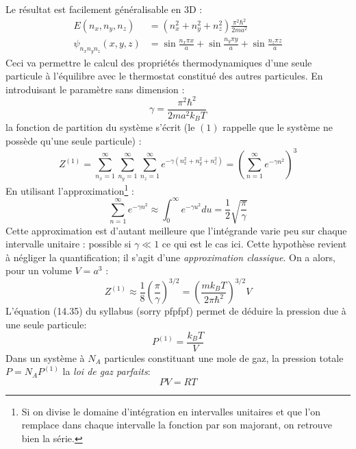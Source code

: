 \documentclass	[11pt, a4paper, openany]{book}
\begin{document}
Le résultat est facilement généralisable en 3D :
\begin{equation}
\begin{array}{ll}
E(n_x,n_y,n_z) &= (n_x^2 +n_y^2+n_z^2)\frac{\pi^2\hbar^2}{2ma^2}\\
\psi_{n_xn_yn_z}(x,y,z) &= \sin\frac{n_x\pi x}{a}+\sin\frac{n_y\pi y}{a}+\sin\frac{n_z\pi z}{a}
\end{array} 
\end{equation}
Ceci va permettre le calcul des propriétés thermodynamiques d'une seule particule à l'équilibre avec
le thermostat constitué des autres particules. En introduisant le paramètre sans dimension :
\begin{equation}
\gamma = \dfrac{\pi^2\hbar^2}{2ma^2k_BT}
\end{equation} 
la fonction de partition du système s'écrit (le $(1)$ rappelle que le système ne possède qu'une
seule particule) :
\begin{equation}
Z^{(1)} = \sum_{n_x=1}^\infty\sum_{n_y=1}^\infty\sum_{n_z=1}^\infty e^{-\gamma(n_x^2 +n_y^2+n_z^2)}
 = \left(\sum_{n=1}^\infty e^{-\gamma n^2}\right)^3
\end{equation}
En utilisant l'approximation\footnote{Si on divise le domaine d'intégration en intervalles unitaires et
que l'on remplace dans chaque intervalle la fonction par son majorant, on retrouve bien la série.} :
\begin{equation}
\sum_{n=1}^\infty e^{-\gamma n^2} \approx \int_0^\infty e^{-\gamma u^2}du = \dfrac{1}{2}\sqrt{\dfrac{\pi}
{\gamma}}
\label{eq:ApproxSerie}
\end{equation}
Cette approximation est d'autant meilleure que l’intégrande varie peu sur chaque intervalle unitaire :
possible si $\gamma \ll 1$ ce qui est le cas ici. Cette hypothèse revient à négliger la quantification;
il s'agit d'une \textit{approximation classique}. On a alors, pour un volume $V=a^3$ :
\begin{equation}
Z^{(1)} \approx \dfrac{1}{8}\left(\dfrac{\pi}{\gamma}\right)^{3/2} = \left(\dfrac{mk_BT}{2\pi\hbar^2}
\right)^{3/2}V
\end{equation}
L'équation (14.35) du syllabus (sorry pfpfpf) permet de déduire la pression due à une seule particule:
\begin{equation}
P^{(1)} = \dfrac{k_BT}{V}
\end{equation}
Dans un système à  $N_A$ particules constituant une mole de gaz, la pression totale $P = N_AP^{(1)}$ la
\textit{loi de gaz parfaits}:
\begin{equation}
PV = RT
\end{equation}
\end{document}
